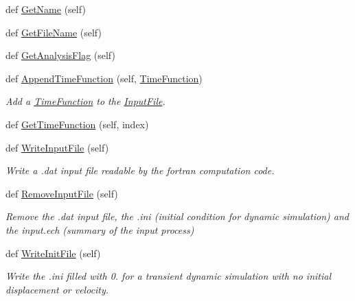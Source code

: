 \begin{DoxyCompactItemize}
\item 
def \hyperlink{classgebtaero_1_1_input_file_1_1_input_file_acae95b1a0b2631341592cf0abe4178c8}{Get\+Name} (self)
\item 
def \hyperlink{classgebtaero_1_1_input_file_1_1_input_file_a3fe8f05410f29d9c555adbee5dae9e16}{Get\+File\+Name} (self)
\item 
def \hyperlink{classgebtaero_1_1_input_file_1_1_input_file_a8d9a4bed8ff821455af85d5440329fe8}{Get\+Analysis\+Flag} (self)
\item 
def \hyperlink{classgebtaero_1_1_input_file_1_1_input_file_a3cf4d7178dc0471896e7c60f6c17e906}{Append\+Time\+Function} (self, \hyperlink{classgebtaero_1_1_time_function_1_1_time_function}{Time\+Function})
\begin{DoxyCompactList}\small\item\em Add a \hyperlink{namespacegebtaero_1_1_time_function}{Time\+Function} to the \hyperlink{classgebtaero_1_1_input_file_1_1_input_file}{Input\+File}. \end{DoxyCompactList}\item 
def \hyperlink{classgebtaero_1_1_input_file_1_1_input_file_a5d53bb9ae864d002dfbbee1231b91881}{Get\+Time\+Function} (self, index)
\item 
def \hyperlink{classgebtaero_1_1_input_file_1_1_input_file_aff90830e65ba0e25b330c595a94a7a82}{Write\+Input\+File} (self)
\begin{DoxyCompactList}\small\item\em Write a .dat input file readable by the fortran computation code. \end{DoxyCompactList}\item 
def \hyperlink{classgebtaero_1_1_input_file_1_1_input_file_a5c0e5660a7e8a816f2fe3b712480306a}{Remove\+Input\+File} (self)
\begin{DoxyCompactList}\small\item\em Remove the .dat input file, the .ini (initial condition for dynamic simulation) and the input.\+ech (summary of the input process) \end{DoxyCompactList}\item 
def \hyperlink{classgebtaero_1_1_input_file_1_1_input_file_a0138cdf368f06be59a355955c737a3c3}{Write\+Init\+File} (self)
\begin{DoxyCompactList}\small\item\em Write the .ini filled with 0. for a transient dynamic simulation with no initial displacement or velocity. \end{DoxyCompactList}\end{DoxyCompactItemize}
